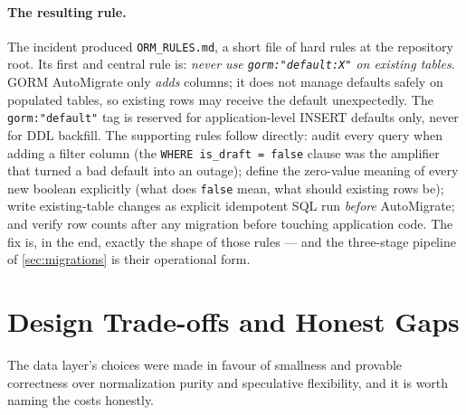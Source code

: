 \paragraph{The resulting rule.} The incident produced \texttt{ORM\_RULES.md},
a short file of hard rules at the repository root. Its first and central rule
is: \emph{never use \texttt{gorm:"default:X"} on existing tables}. GORM
AutoMigrate only \emph{adds} columns; it does not manage defaults safely on
populated tables, so existing rows may receive the default unexpectedly. The
\texttt{gorm:"default"} tag is reserved for application-level INSERT defaults
only, never for DDL backfill. The supporting rules follow directly: audit
every query when adding a filter column (the \texttt{WHERE is\_draft = false}
clause was the amplifier that turned a bad default into an outage); define the
zero-value meaning of every new boolean explicitly (what does \texttt{false}
mean, what should existing rows be); write existing-table changes as explicit
idempotent SQL run \emph{before} AutoMigrate; and verify row counts after any
migration before touching application code. The fix is, in the end, exactly
the shape of those rules --- and the three-stage pipeline of
\cref{sec:migrations} is their operational form.

\section{Design Trade-offs and Honest Gaps}

The data layer's choices were made in favour of smallness and provable
correctness over normalization purity and speculative flexibility, and it is
worth naming the costs honestly.

